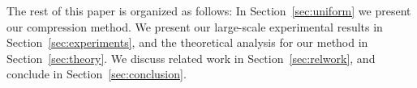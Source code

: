 
The rest of this paper is organized as follows: In Section~\ref{sec:uniform} we present our compression method. We present our large-scale experimental results in Section~\ref{sec:experiments}, and the theoretical analysis for our method in Section~\ref{sec:theory}. We discuss related work in Section~\ref{sec:relwork}, and conclude in Section~\ref{sec:conclusion}.
